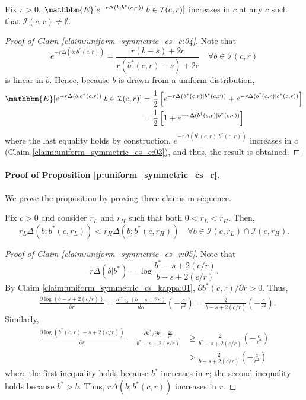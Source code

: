 \begin{appendices}
\begin{claim}\label{claim:uniform_symmetric_cs_c:04} 
Fix $r>0$. $\mathbbm{E}[e^{-r\Delta(b;b^*(c,r))}|b\in \mathcal{I}(c,r)]$ increases in $c$ at any $c$ such that $\mathcal{I}(c,r)\neq\emptyset$. 
\end{claim}

\begin{proof}[Proof of Claim \ref{claim:uniform_symmetric_cs_c:04}] 
Note that
    $$
    e^{-r\Delta(b;b^*(c,r))}=\frac{r(b-s)+2c}{r(b^*(c,r)-s)+2c} \quad\forall b\in \mathcal{I}(c,r)
    $$
is linear in $b$. Hence, because $b$ is drawn from a uniform distribution, 
    \begin{align*}
    \mathbbm{E}[e^{-r\Delta(b;b^*(c,r))}|b\in \mathcal{I}(c,r)] 
    & = 
    \frac{1}{2}\left[e^{-r\Delta(b^*(c,r)|b^*(c,r))}+e^{-r\Delta(b^\dagger(c,r)|b^*(c,r))}\right]
    \\
    &=
    \frac{1}{2}\left[1+e^{-r\Delta(b^\dagger(c,r)|b^*(c,r))}\right]
    \end{align*}
where the last equality holds by construction. $e^{-r\Delta(b^\dagger(c,r)|b^*(c,r))}$ increases in $c$ (Claim \ref{claim:uniform_symmetric_cs_c:03}), and thus, the result is obtained. 
\end{proof}

\paragraph{Proof of Proposition \ref{p:uniform_symmetric_cs_r}.}
We prove the proposition by proving three claims in sequence. 

\begin{claim}\label{claim:uniform_symmetric_cs_r:05} 
Fix $c>0$ and consider $r_L$ and $r_H$ such that both $0<r_L<r_H$. Then, 
    $$
    r_L\Delta(b;b^*(c,r_L)) < r_H\Delta(b;b^*(c,r_H)) \quad\forall b\in \mathcal{I}(c,r_L)\cap \mathcal{I}(c,r_H). 
    $$
\end{claim}


\begin{proof}[Proof of Claim \ref{claim:uniform_symmetric_cs_r:05}] 
Note that 
    $$
    r\Delta(b|b^*) = \log\frac{b^*-s+2(c/r)}{b-s+2(c/r)}.
    $$
By Claim \ref{claim:uniform_symmetric_cs_kappa:01}, $\partial b^*(c,r)/\partial r>0$. Thus, 
    \begin{align*}
    &
    \frac{\partial \log (b-s+2(c/r))}{\partial r}=
    \frac{d\log (b-s+2\kappa)}{d \kappa}\left(-\frac{c}{r^2}\right) = \frac{2}{b-s+2(c/r)} \left(-\frac{c}{r^2}\right).
    \end{align*}
Similarly, 
    \begin{align*}
    \frac{\partial\log (b^*(c,r)-s+2(c/r))}{\partial r} = \frac{\partial b^*/\partial r-\frac{2c}{r^2}}{b^*-s+2(c/r)}
    &\geq  \frac{2}{b^*-s+2(c/r)}\left(-\frac{c}{r^2}\right)
    \\
    &> \frac{2}{b-s+2(c/r)}\left(-\frac{c}{r^2}\right)
    \end{align*}
where the first inequality holds because $b^*$ increases in $r$; the second inequality holds because $b^*>b$. Thus, $r\Delta(b;b^*(c,r))$ increases in $r$.
\end{proof}



\end{appendices}
